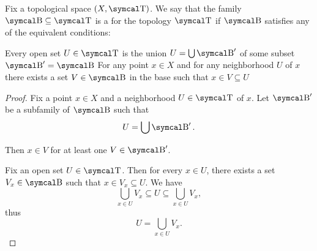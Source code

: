 \begin{definition}\label{def:topological_base}\cite[12]{Engelking1989}
  Fix a topological space \( (X, \CT) \). We say that the family \( \CB \subseteq \CT \) is a  for the topology \( \CT \) if \( \CB \) satisfies any of the equivalent conditions:
  \begin{defenum}
     Every open set \( U \in \CT \) is the union \( U = \bigcup \CB' \) of some subset \( \CB' = \CB \)
     For any point \( x \in X \) and for any neighborhood \( U \) of \( x \) there exists a set \( V \in \CB \) in the base such that \( x \in V \subseteq U \)
  \end{defenum}
\end{definition}
\begin{proof}
   Fix a point \( x \in X \) and a neighborhood \( U \in \CT \) of \( x \). Let \( \CB' \) be a subfamily of \( \CB \) such that
  \begin{equation*}
    U = \bigcup \CB'.
  \end{equation*}

  Then \( x \in V \) for at least one \( V \in \CB' \).

   Fix an open set \( U \in \CT \). Then for every \( x \in U \), there exists a set \( V_x \in \CB \) such that \( x \in V_x \subseteq U \). We have
  \begin{equation*}
    \bigcup_{x \in U} V_x \subseteq U \subseteq \bigcup_{x \in U} V_x,
  \end{equation*}
  thus
  \begin{equation*}
    U = \bigcup_{x \in U} V_x.
  \end{equation*}
\end{proof}

